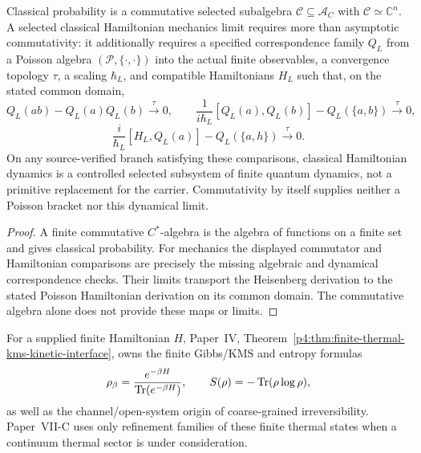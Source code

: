 \documentclass[12pt,a4paper]{article}
\begin{document}
\begin{proposition}
\label{p12:prop:classical-subsystem}
Classical probability is a commutative selected subalgebra
\(\mathcal C\subseteq\mathcal A_C\) with
\(\mathcal C\simeq\mathbb C^n\). A selected classical Hamiltonian
mechanics limit requires more than asymptotic commutativity: it additionally
requires a specified correspondence family \(Q_L\) from a Poisson algebra
\((\mathcal P,\{\cdot,\cdot\})\) into the actual finite observables,
a convergence topology \(\tau\), a scaling \(\hbar_L\), and
compatible Hamiltonians \(H_L\) such that, on the stated common domain,
\[
 Q_L(ab)-Q_L(a)Q_L(b)\xrightarrow{\tau}0,
 \qquad
 \frac{1}{i\hbar_L}[Q_L(a),Q_L(b)]
   -Q_L(\{a,b\})\xrightarrow{\tau}0,
\]
\[
 \frac{i}{\hbar_L}[H_L,Q_L(a)]
   -Q_L(\{a,h\})\xrightarrow{\tau}0.
\]
On any source-verified branch satisfying these comparisons, classical
Hamiltonian dynamics is a controlled selected subsystem of finite quantum
dynamics, not a primitive replacement for the carrier. Commutativity by
itself supplies neither a Poisson bracket nor this dynamical limit.
\end{proposition}
\begin{proof}
A finite commutative \(C^*\)-algebra is the algebra of functions on a
finite set and gives classical probability. For mechanics the displayed
commutator and Hamiltonian comparisons are precisely the missing
algebraic and dynamical correspondence checks. Their limits transport the
Heisenberg derivation to the stated Poisson Hamiltonian derivation on its
common domain. The commutative algebra alone does not provide these maps or
limits.
\end{proof}

\begin{remark}
\label{p12:prop:thermodynamics-subsystem}
For a supplied finite Hamiltonian \(H\), Paper~IV, Theorem~\ref{p4:thm:finite-thermal-kms-kinetic-interface}, owns the finite Gibbs/KMS and
entropy formulas
\[
\rho_\beta=\frac{e^{-\beta H}}{\operatorname{Tr}(e^{-\beta H})},
\qquad
S(\rho)=-\operatorname{Tr}(\rho\log\rho),
\]
as well as the channel/open-system origin of coarse-grained irreversibility.
Paper~VII-C uses only refinement families of these finite thermal states when a
continuum thermal sector is under consideration.
\end{remark}
\end{document}
